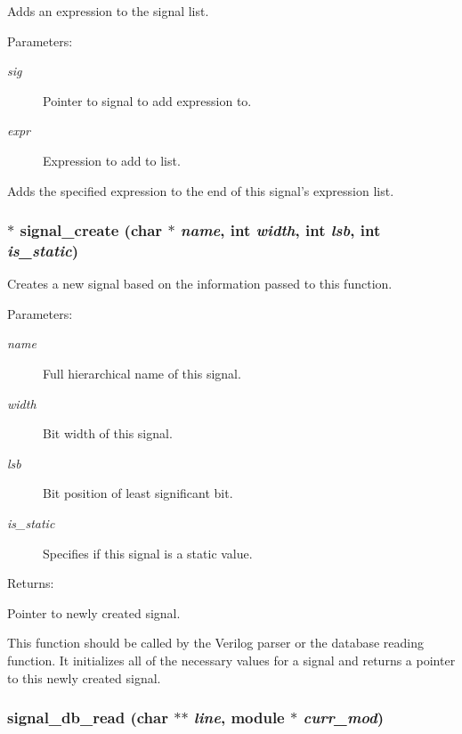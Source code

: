 Adds an expression to the signal list.

\begin{Desc}
\item[Parameters: ]\par
\begin{description}
\item[{\em 
sig}]Pointer to signal to add expression to. \item[{\em 
expr}]Expression to add to list.\end{description}
\end{Desc}
Adds the specified expression to the end of this signal's expression list. 
\subsubsection{$\ast$ signal\_\-create (char $\ast$ {\em name}, int {\em width}, int {\em lsb}, int {\em is\_\-static})}\label{signal_8c_a1}


Creates a new signal based on the information passed to this function.

\begin{Desc}
\item[Parameters: ]\par
\begin{description}
\item[{\em 
name}]Full hierarchical name of this signal. \item[{\em 
width}]Bit width of this signal. \item[{\em 
lsb}]Bit position of least significant bit. \item[{\em 
is\_\-static}]Specifies if this signal is a static value.\end{description}
\end{Desc}
\begin{Desc}
\item[Returns: ]\par
Pointer to newly created signal.\end{Desc}
This function should be called by the Verilog parser or the database reading function. It initializes all of the necessary values for a signal and returns a pointer to this newly created signal. 
\subsubsection{ signal\_\-db\_\-read (char $\ast$$\ast$ {\em line}, {\bf module} $\ast$ {\em curr\_\-mod})}\label{signal_8c_a4}


